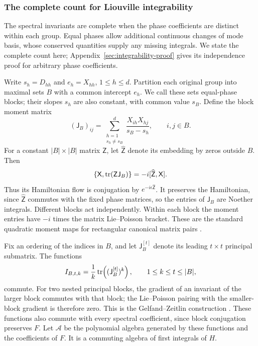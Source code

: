 \subsubsection{The complete count for Liouville integrability}
\label{sec:canonical-independence}

The spectral invariants are complete when the phase coefficients are
distinct within each group. Equal phases allow additional continuous
changes of mode basis, whose conserved quantities supply any missing
integrals. We state the complete count here; Appendix~\ref{sec:integrability-proof}
gives its independence proof for arbitrary phase coefficients.

Write $s_h=D_{hh}$ and $e_h=X_{hh}$, $1\leq h\leq d$.
Partition each original group into maximal sets $B$ with a common
intercept $e_h$. We call these sets equal-phase blocks; their slopes
$s_h$ are also constant, with common value $s_B$.
Define the block moment matrix
\begin{equation}\label{eq:canonical-block-moment}
 (\mathsf J_B)_{ij}
 =\sum_{\substack{h=1\\s_h\ne s_B}}^d
       \frac{X_{ih}X_{hj}}{s_B-s_h},
 \qquad i,j\in B.
\end{equation}
For a constant $|B|\times|B|$ matrix $\mathsf Z$, let $\widehat{\mathsf Z}$ denote its
embedding by zeros outside $B$. Then
\[
 \{\mathsf X,\operatorname{tr}(\mathsf Z\mathsf J_B)\}=-i[\widehat{\mathsf Z},\mathsf X].
\]
Thus its Hamiltonian flow is conjugation by $e^{-i\epsilon\widehat{\mathsf Z}}$.
It preserves the Hamiltonian, since $\widehat{\mathsf Z}$ commutes with the fixed phase
matrices, so the entries of $\mathsf J_B$ are Noether integrals.
Different blocks act independently. Within each block the moment
entries have $-i$ times the matrix Lie--Poisson bracket.
These are the standard quadratic moment maps for rectangular canonical
matrix pairs \cite[Section~2]{Harnad1994}.

Fix an ordering of the indices in $B$, and let $\mathsf J_B^{[t]}$
denote its leading $t\times t$ principal submatrix. The functions
\begin{equation}\label{eq:canonical-moment-chain}
 I_{B,t,k}=\frac1k\operatorname{tr}\!\left((\mathsf J_B^{[t]})^k\right),
 \qquad 1\leq k\leq t\leq |B|,
\end{equation}
commute. For two nested principal blocks, the gradient of an
invariant of the larger block commutes with that block; the
Lie--Poisson pairing with the smaller-block gradient is therefore zero.
This is the Gelfand--Zeitlin construction
\cite{GuilleminSternberg1983}. These functions also commute with every
spectral coefficient, since block conjugation preserves $F$.
Let $\mathcal A$ be the polynomial algebra generated by these functions
and the coefficients of $F$. It is a commuting algebra of first
integrals of $H$.

